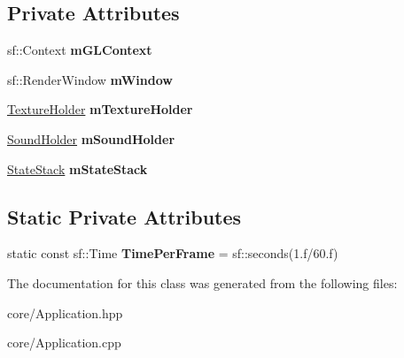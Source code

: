 \subsection*{\-Private \-Attributes}
\begin{DoxyCompactItemize}
\item 
\hypertarget{classApplication_ac3e5164a1ec3d2dfaecc6724692d10c3_ac3e5164a1ec3d2dfaecc6724692d10c3}{sf\-::\-Context {\bfseries m\-G\-L\-Context}}\label{classApplication_ac3e5164a1ec3d2dfaecc6724692d10c3_ac3e5164a1ec3d2dfaecc6724692d10c3}

\item 
\hypertarget{classApplication_a1c1480e1f6bd4e2d3fe9a5d2171a5a54_a1c1480e1f6bd4e2d3fe9a5d2171a5a54}{sf\-::\-Render\-Window {\bfseries m\-Window}}\label{classApplication_a1c1480e1f6bd4e2d3fe9a5d2171a5a54_a1c1480e1f6bd4e2d3fe9a5d2171a5a54}

\item 
\hypertarget{classApplication_a5b885fafceb746e25b88a7afecf1e811_a5b885fafceb746e25b88a7afecf1e811}{\hyperlink{classTextureHolder}{\-Texture\-Holder} {\bfseries m\-Texture\-Holder}}\label{classApplication_a5b885fafceb746e25b88a7afecf1e811_a5b885fafceb746e25b88a7afecf1e811}

\item 
\hypertarget{classApplication_a0a84a8c5be50884234d0499833b82c26_a0a84a8c5be50884234d0499833b82c26}{\hyperlink{classSoundHolder}{\-Sound\-Holder} {\bfseries m\-Sound\-Holder}}\label{classApplication_a0a84a8c5be50884234d0499833b82c26_a0a84a8c5be50884234d0499833b82c26}

\item 
\hypertarget{classApplication_a8b01542499e71a40c2ed277cac4b6abe_a8b01542499e71a40c2ed277cac4b6abe}{\hyperlink{classStateStack}{\-State\-Stack} {\bfseries m\-State\-Stack}}\label{classApplication_a8b01542499e71a40c2ed277cac4b6abe_a8b01542499e71a40c2ed277cac4b6abe}

\end{DoxyCompactItemize}
\subsection*{\-Static \-Private \-Attributes}
\begin{DoxyCompactItemize}
\item 
\hypertarget{classApplication_a0c54e0e34ffc2c1354902604a7038b37_a0c54e0e34ffc2c1354902604a7038b37}{static const sf\-::\-Time {\bfseries \-Time\-Per\-Frame} = sf\-::seconds(1.f/60.f)}\label{classApplication_a0c54e0e34ffc2c1354902604a7038b37_a0c54e0e34ffc2c1354902604a7038b37}

\end{DoxyCompactItemize}


\-The documentation for this class was generated from the following files\-:\begin{DoxyCompactItemize}
\item 
core/\-Application.\-hpp\item 
core/\-Application.\-cpp\end{DoxyCompactItemize}
